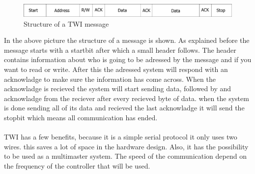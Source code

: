\documentclass[10pt,a4paper]{article}
\begin{document}
\begin{figure}[H]
        \centering
        \graphicspath{ {./images/} }
        \includegraphics[scale=.3]{TWImessage.pdf}
        \caption{Structure of a TWI message}
        \label{fig:TWIstructure}
\end{figure}
In the above picture the structure of a message is shown. As explained before the message starts with a startbit after which a small header follows. The header contains information about who is going to be adressed by the message and if you want to read or write. After this the adressed system will respond with an acknowladge to make sure the information has come across. When the acknowladge is recieved the system will start sending data, followed by and acknowladge from the reciever after every recieved byte of data. when the system is done sending all of its data and recieved the last acknowladge it will send the stopbit which means all communication has ended.
\\
\\
TWI has a few benefits, because it is a simple serial protocol it only uses two wires. this saves a lot of space in the hardware design. Also, it has the possibility to be used as a multimaster system.
The speed of the communication depend on the frequency of the controller that will be used.
\end{document}
